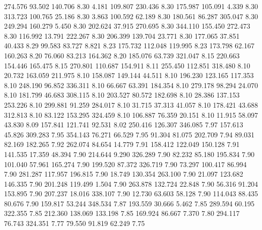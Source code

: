  274.576   93.502  140.706         8.30
   4.181  109.807  230.436         8.30
 175.987  105.091    4.339         8.30
 313.723  100.765   25.186         8.30
   3.863  100.592   62.189         8.30
 180.561   86.287  305.047         8.30
 249.294  160.279    5.450         8.30
 202.624   37.915  270.695         8.30
 344.110  155.450  272.473         8.30
 116.992   13.791  222.267         8.30
 206.399  139.704   23.771         8.30
 177.065   37.851   40.433         8.29
  99.583   83.727    8.821         8.23
 175.732  112.048  119.995         8.23
 173.798   62.167  160.263         8.20
  76.060   83.213  164.362         8.20
 185.076   63.739  321.047         8.15
 220.663  154.446  165.475         8.15
 270.801  110.687  154.911         8.11
 255.450  112.851  318.480         8.10
  20.732  163.059  211.975         8.10
 158.087  149.144   44.511         8.10
 196.230  123.165  117.353         8.10
 248.190   96.852  336.311         8.10
  66.667   63.391  184.354         8.10
 279.178   98.294   24.070         8.10
 181.799   46.683  308.115         8.10
 203.527   80.572  182.698         8.10
  28.386  137.153  253.226         8.10
 299.881   91.259  284.017         8.10
  31.715   37.313   41.057         8.10
 178.421   43.688  312.813         8.10
  83.122  153.295  324.459         8.10
 106.887   76.359   20.151         8.10
  11.915   58.097   43.830         8.09
 157.841  121.741   92.531         8.02
 250.416  126.307  346.085         7.97
 157.613   45.826  309.283         7.95
 354.143   76.271   66.529         7.95
  91.304   81.075  202.709         7.94
  89.031   82.169  182.265         7.92
 262.074   84.654   14.779         7.91
 158.412  122.049  150.128         7.91
 141.535   17.359   48.394         7.90
 214.644    9.290  326.289         7.90
  82.232   85.180  195.834         7.90
 101.040   57.961  165.274         7.90
 199.520   87.372  326.719         7.90
  73.297  100.417   86.994         7.90
 281.287  117.957  196.815         7.90
  18.749  130.354  263.100         7.90
  21.097  123.682  146.335         7.90
 201.248  119.499    1.504         7.90
 263.878  132.724   22.848         7.90
  56.316   91.204  153.895         7.90
 207.237   18.016  338.107         7.90
  12.730   63.603   58.128         7.90
 114.043   88.435   80.676         7.90
 159.817   53.244  348.534         7.87
 193.559   30.666    5.462         7.85
 289.594   60.195  322.355         7.85
 212.360  138.069  133.198         7.85
 169.924   86.667    7.370         7.80
 294.117   76.743  324.351         7.77
  79.550   91.819   62.249         7.75
